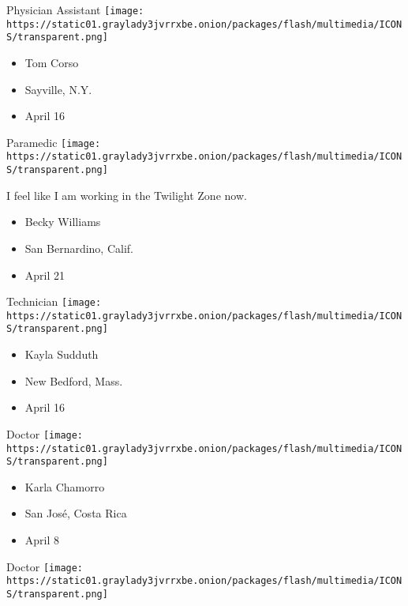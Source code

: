 \protect\hyperlink{item-tom-corso}{}

Physician Assistant
\texttt{[image: https://static01.graylady3jvrrxbe.onion/packages/flash/multimedia/ICONS/transparent.png]}

\begin{itemize}
\tightlist
\item
  Tom Corso
\item
  Sayville, N.Y.
\item
  April 16
\end{itemize}

\protect\hyperlink{item-becky-williams}{}

Paramedic
\texttt{[image: https://static01.graylady3jvrrxbe.onion/packages/flash/multimedia/ICONS/transparent.png]}

I feel like I am working in the Twilight Zone now.

\begin{itemize}
\tightlist
\item
  Becky Williams
\item
  San Bernardino, Calif.
\item
  April 21
\end{itemize}

\protect\hyperlink{item-kayla-sudduth}{}

Technician
\texttt{[image: https://static01.graylady3jvrrxbe.onion/packages/flash/multimedia/ICONS/transparent.png]}

\begin{itemize}
\tightlist
\item
  Kayla Sudduth
\item
  New Bedford, Mass.
\item
  April 16
\end{itemize}

\protect\hyperlink{item-karla-chamorro}{}

Doctor
\texttt{[image: https://static01.graylady3jvrrxbe.onion/packages/flash/multimedia/ICONS/transparent.png]}

\begin{itemize}
\tightlist
\item
  Karla Chamorro
\item
  San José, Costa Rica
\item
  April 8
\end{itemize}

\protect\hyperlink{item-hesham-hassaballa}{}

Doctor
\texttt{[image: https://static01.graylady3jvrrxbe.onion/packages/flash/multimedia/ICONS/transparent.png]}

